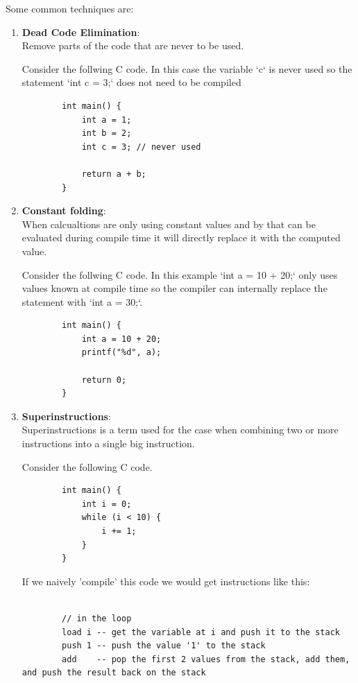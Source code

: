 \documentclass{article}
\begin{document}
Some common techniques are:
\begin{enumerate}
    \item \textbf{Dead Code Elimination}:\\
    \label{item:dead_code_elimination}
        Remove parts of the code that are never to be used.

        Consider the follwing C code. In this case the variable `c` is never
        used so the statement `int c = 3;` does not need to be compiled
        \begin{verbatim}
        int main() {
            int a = 1;
            int b = 2;
            int c = 3; // never used

            return a + b;
        }
        \end{verbatim}
    \item \textbf{Constant folding}:\\
        When calcualtions are only using constant values and by that can be
        evaluated during compile time it will directly replace it with the
        computed value.

        Consider the follwing C code. In this example `int a = 10 + 20;` only uses values known
        at compile time so the compiler can internally replace the statement with `int a = 30;`.
        \begin{verbatim}
        int main() {
            int a = 10 + 20;
            printf("%d", a);

            return 0;
        }
        \end{verbatim}
    \item \textbf{Superinstructions}:\\
        Superinstructions is a term used for the case when combining two or more instructions 
        into a single big instruction.

        Consider the following C code.

        \begin{verbatim}
        int main() {
            int i = 0;
            while (i < 10) {
                i += 1;
            }
        }
        \end{verbatim}

        If we naively 'compile' this code we would get instructions like this:

        \begin{verbatim}

        // in the loop
        load i -- get the variable at i and push it to the stack
        push 1 -- push the value '1' to the stack
        add    -- pop the first 2 values from the stack, add them, and push the result back on the stack


\end{verbatim}
\end{enumerate}
\end{document}
